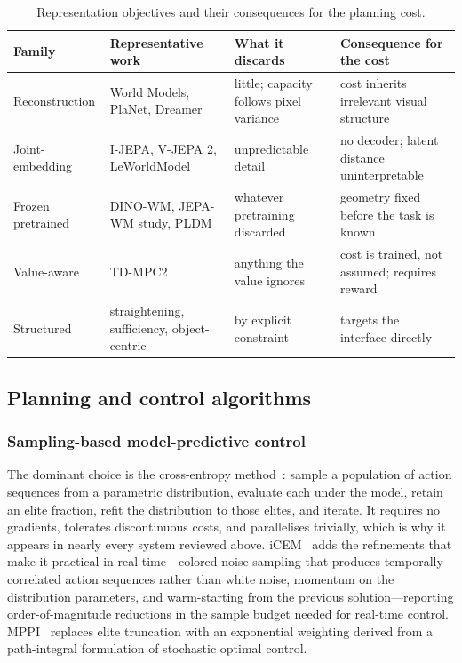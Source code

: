 \documentclass[11pt,letterpaper]{article}
\begin{document}
\begin{table}[t]
\centering\footnotesize
\caption{Representation objectives and their consequences for the planning
cost.}\label{tab:repr}
\begin{tabularx}{\textwidth}{@{}L{2.7cm} L{3.5cm} L{3.1cm} Y@{}}
\toprule
Family & Representative work & What it discards & Consequence for the cost \\
\midrule
Reconstruction & World Models, PlaNet, Dreamer & little; capacity follows pixel
variance & cost inherits irrelevant visual structure \\
Joint-embedding & I-JEPA, V-JEPA 2, LeWorldModel & unpredictable detail & no
decoder; latent distance uninterpretable \\
Frozen pretrained & DINO-WM, JEPA-WM study, PLDM & whatever pretraining discarded
& geometry fixed before the task is known \\
Value-aware & TD-MPC2 & anything the value ignores & cost is trained, not
assumed; requires reward \\
Structured & straightening, sufficiency, object-centric & by explicit constraint &
targets the interface directly \\
\bottomrule
\end{tabularx}
\end{table}

\subsection{Planning and control algorithms}\label{sec:lit-planners}

\subsubsection{Sampling-based model-predictive control}

The dominant choice is the cross-entropy method~\citep{rubinstein1997cem}:
sample a population of action sequences from a parametric distribution, evaluate
each under the model, retain an elite fraction, refit the distribution to those
elites, and iterate. It requires no gradients, tolerates discontinuous costs,
and parallelises trivially, which is why it appears in nearly every system
reviewed above. iCEM~\citep{pinneri2020icem} adds the refinements that make it
practical in real time---colored-noise sampling that produces temporally
correlated action sequences rather than white noise, momentum on the
distribution parameters, and warm-starting from the previous solution---reporting
order-of-magnitude reductions in the sample budget needed for real-time control.
MPPI~\citep{williams2017mppi} replaces elite truncation with an exponential
weighting derived from a path-integral formulation of stochastic optimal
control.
\end{document}
